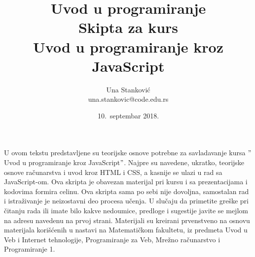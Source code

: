 \documentclass[a4paper]{article}
\begin{document}
\title{Uvod u programiranje\\ \small{Skipta za kurs\\Uvod u programiranje kroz JavaScript\\}}

\author{Una Stanković\\ una.stankovic@code.edu.rs}
\date{10.~septembar 2018.}
\maketitle
\newpage

U ovom tekstu predstavljene su teorijske osnove potrebne za savladavanje kursa $"$ Uvod u programiranje kroz JavaScript$"$. Najpre su navedene, ukratko, teorijske osnove računarstva i uvod kroz HTML i CSS, a kasnije se ulazi u rad sa JavaScript-om.  Ova skripta je obavezan materijal pri kursu i sa prezentacijama i kodovima formira celinu. Ova skripta sama po sebi nije dovoljna, samostalan rad i istraživanje je neizostavni deo procesa učenja. U slučaju da primetite greške pri čitanju rada ili imate bilo kakve nedoumice, predloge i sugestije javite se mejlom na adresu navedenu na prvoj strani.
Materijali su kreirani prvenstveno na osnovu materijala korišćenih u nastavi na Matematičkom fakultetu, iz predmeta Uvod u Veb i Internet tehnologije, Programiranje za Veb, Mrežno računarstvo i Programiranje 1. 
\newpage

\tableofcontents

\newpage
\end{document}
